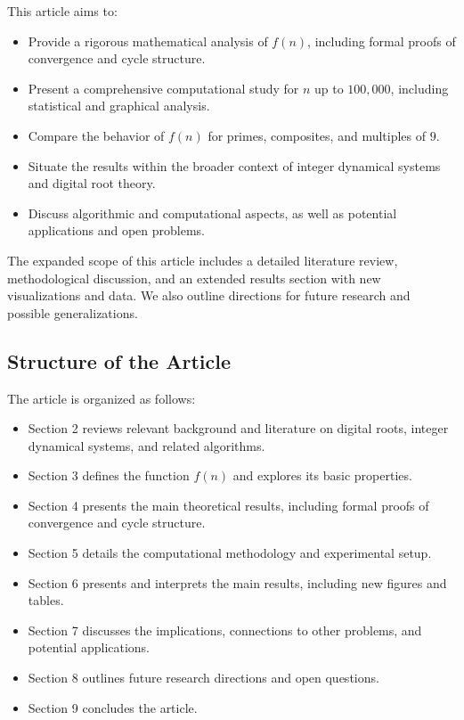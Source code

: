 \documentclass[12pt]{article}
\begin{document}
This article aims to:
\begin{itemize}
    \item Provide a rigorous mathematical analysis of $f(n)$, including formal proofs of convergence and cycle structure.
    \item Present a comprehensive computational study for $n$ up to $100,000$, including statistical and graphical analysis.
    \item Compare the behavior of $f(n)$ for primes, composites, and multiples of $9$.
    \item Situate the results within the broader context of integer dynamical systems and digital root theory.
    \item Discuss algorithmic and computational aspects, as well as potential applications and open problems.
\end{itemize}

The expanded scope of this article includes a detailed literature review, methodological discussion, and an extended results section with new visualizations and data. We also outline directions for future research and possible generalizations.

\subsection{Structure of the Article}
The article is organized as follows:
\begin{itemize}
    \item Section 2 reviews relevant background and literature on digital roots, integer dynamical systems, and related algorithms.
    \item Section 3 defines the function $f(n)$ and explores its basic properties.
    \item Section 4 presents the main theoretical results, including formal proofs of convergence and cycle structure.
    \item Section 5 details the computational methodology and experimental setup.
    \item Section 6 presents and interprets the main results, including new figures and tables.
    \item Section 7 discusses the implications, connections to other problems, and potential applications.
    \item Section 8 outlines future research directions and open questions.
    \item Section 9 concludes the article.
\end{itemize}
\end{document}
